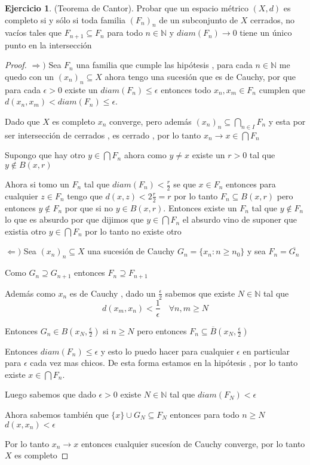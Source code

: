 \documentclass[12pt]{article}
\newcommand{\N}{\mathbb{N}}
\newcommand{\Ra}{\Rightarrow}
\newcommand{\ra}{\rightarrow}
\newcommand{\ol}{\overline}
\theoremstyle{definition}
\newtheorem{ej}{Ejercicio}
\begin{document}
\begin{ej}
  (Teorema de Cantor). Probar que un espacio métrico $(X,d)$ es completo si y sólo si toda familia $(F_n)_n$ de un subconjunto de $X$ cerrados, no vacíos tales que $F_{n + 1} \subseteq F_n$ para todo $n \in \N$ y $diam(F_n) \ra 0$ tiene un único punto en la intersección
  \begin{proof}
  $\Ra )$ Sea $F_n$ una familia que cumple las hipótesis , para cada $n \in \N$ me quedo con un $(x_n)_n \subseteq X$ ahora tengo una sucesión que es de Cauchy, por que para cada $\epsilon >0$ existe un $diam(F_n) \leq \epsilon$ entonces todo $x_n,x_m \in F_{n}$ cumplen que $d(x_n,x_m) < diam (F_{n}) \leq \epsilon $.

  Dado que $X$ es completo $x_n$ converge, pero además $(x_n)_n \subseteq \bigcap_{n \in I} F_n$ y esta por ser intersección de cerrados , es cerrado , por lo tanto $x_n \ra x \in \bigcap F_n$

  Supongo que hay otro $y \in \bigcap F_n$ ahora como $y \neq x$ existe un $r>0$ tal que $y \notin B(x,r)$

  Ahora si tomo un $F_n$ tal que $diam(F_n) < \frac{r}{2}$ se que $x \in F_n$ entonces para cualquier $z \in F_n$ tengo que $d(x,z) < 2 \frac{r}{2} = r$ por lo tanto $F_n \subseteq B(x,r)$ pero entonces $y \notin F_n$ por que si no $y \in B(x,r)$. Entonces existe un $F_n$ tal que $y \notin F_n$ lo que es absurdo por que dijimos que $y \in \bigcap F_n$ el absurdo vino de suponer que existia otro $y \in \bigcap F_n$ por lo tanto no existe otro 
  
$\Leftarrow )$ Sea $(x_n)_n \subseteq X$ una sucesión de Cauchy $G_n = \{x_n : n \geq n_0\}$ y sea $F_n = \ol{G_n}$

Como $G_n \supseteq G_{n +1}$ entonces $F_n \supseteq F_{n+1}$

Además como $x_n$ es de Cauchy , dado un $\frac{\epsilon}{2}$ sabemos que existe $N \in \N$ tal que 
$$d(x_m,x_n) < \frac{1}{\epsilon} \quad \forall n,m \geq N$$

Entonces $G_n \in B(x_N,\frac{\epsilon}{2})$ si $ n \geq N$ pero entonces $F_n \subseteq \ol{B}(x_N,\frac{\epsilon}{2})$ 

Entonces $diam(F_n) \leq \epsilon$ y esto lo puedo hacer para cualquier $\epsilon$ en particular para $\epsilon$ cada vez mas chicos. De esta forma estamos en la hipótesis , por lo tanto existe $x \in \bigcap F_n$. 

Luego sabemos que dado $\epsilon > 0$ existe $N \in \N$ tal que $diam(F_N) < \epsilon$

Ahora sabemos también que $\{x\} \cup G_N \subseteq F_N$ entonces para todo $n \geq N$ $d(x,x_n) < \epsilon$

Por lo tanto $x_n \ra x$ entonces cualquier sucesíon de Cauchy converge, por lo tanto $X$ es completo
  \end{proof}
\end{ej} 
\end{document}
